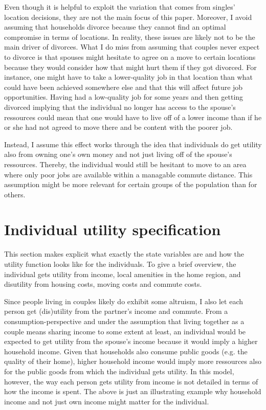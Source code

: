 Even though it is helpful to exploit the variation that comes from singles' location decisions, they are not the main focus of this paper. Moreover, I avoid assuming that households divorce because they cannot find an optimal compromise in terms of locations. In reality, these issues are likely not to be the main driver of divorces. What I do miss from assuming that couples never expect to divorce is that spouses might hesitate to agree on a move to certain locations because they would consider how that might hurt them if they got divorced. For instance, one might have to take a lower-quality job in that location than what could have been achieved somewhere else and that this will affect future job opportunities. Having had a low-quality job for some years and then getting divorced implying that the individual no longer has access to the spouse's ressources could mean that one would have to live off of a lower income than if he or she had not agreed to move there and be content with the poorer job.

Instead, I assume this effect works through the idea that individuals do get utility also from owning one's own money and not just living off of the spouse's ressources. Thereby, the individual would still be hesitant to move to an area where only poor jobs are available within a managable commute distance. This assumption might be more relevant for certain groups of the population than for others.  

\section{Individual utility specification}
This section makes explicit what exactly the state variables are and how the utility function looks like for the individuals. To give a brief overview, the individual gets utility from income, local amenities in the home region, and disutility from housing costs, moving costs and commute costs. 

Since people living in couples likely do exhibit some altruism, I also let each person get (dis)utility from the partner's income and commute. From a consumption-perspective and under the assumption that living together as a couple means sharing income to some extent at least, an individual would be expected to get utility from the spouse's income because it would imply a higher household income. Given that households also consume public goods (e.g. the quality of their home), higher household income would imply more ressources also for the public goods from which the individual gets utility. In this model, however, the way each person gets utility from income is not detailed in terms of how the income is spent. The above is just an illustrating example why household income and not just own income might matter for the individual. 

